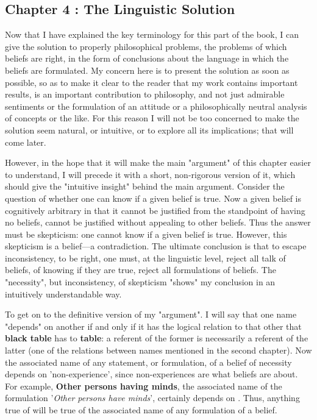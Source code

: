 \documentclass[10pt,twoside,draft]{memoir}
\newcommand{\formulation}[1]{'\textit{#1}'}
\newcommand{\name}[1]{\textbf{#1}}
\begin{document}
{\subsection*{Chapter 4 : The Linguistic Solution}

Now that I have explained the key terminology for this part of the 
book, I can give the solution to properly philosophical problems, the 
problems of which beliefs are right, in the form of conclusions about the 
language in which the beliefs are formulated. My concern here is to present 
the solution as soon as possible, so as to make it clear to the reader that my 
work contains important results, is an important contribution to philosophy, 
and not just admirable sentiments or the formulation of an attitude or a 
philosophically neutral analysis of concepts or the like. For this reason I will 
not be too concerned to make the solution seem natural, or intuitive, or to 
explore all its implications; that will come later. 

However, in the hope that it will make the main "argument" of this 
chapter easier to understand, I will precede it with a short, non-rigorous 
version of it, which should give the "intuitive insight" behind the main 
argument. Consider the question of whether one can know if a given belief is 
true. Now a given belief is cognitively arbitrary in that it cannot be justified 
from the standpoint of having no beliefs, cannot be justified without 
appealing to other beliefs. Thus the answer must be skepticism: one cannot 
know if a given belief is true. However, this skepticism is a belief---a 
contradiction. The ultimate conclusion is that to escape inconsistency, to be 
right, one must, at the linguistic level, reject all talk of beliefs, of knowing if 
they are true, reject all formulations of beliefs. The "necessity", but 
inconsistency, of skepticism "shows" my conclusion in an intuitively 
understandable way. 

To get on to the definitive version of my "argument". I will say that 
one name "depends" on another if and only if it has the logical relation to 
that other that \name{black table} has to \name{table}: a referent of the former is 
necessarily a referent of the latter (one of the relations between names 
mentioned in the second chapter). Now the associated name of any 
statement, or formulation, of a belief of necessity depends on 
'non-experience', since non-experiences are what beliefs are about. For 
example, \name{Other persons having minds}, the associated name of the 
formulation \formulation{Other persons have minds}, certainly depends on 
. Thus, anything true of  will be true of the 
associated name of any formulation of a belief. 

}
\end{document}
